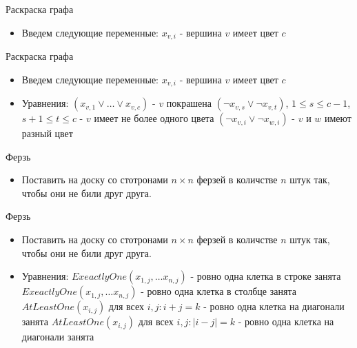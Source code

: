 \documentclass{beamer}
\begin{document}
\begin{frame}{Раскраска графа}
\begin{itemize}
\item Введем следующие переменные:\newline
$x_{v,i}$ - вершина $v$ имеет цвет $c$
\end{itemize}
\end{frame}

\begin{frame}{Раскраска графа}
\begin{itemize}
\item Введем следующие переменные:\newline
$x_{v,i}$ - вершина $v$ имеет цвет $c$
\item Уравнения:\newline
$(x_{v,1} \vee \dots \vee x_{v,c})$ - $v$ покрашена\newline
$(\lnot x_{v,s} \vee \lnot x_{v,t})$, $1 \le s \le c - 1$, $s + 1 \le t \le c$ - $v$ имеет не более одного цвета\newline
$(\lnot x_{v,i} \vee \lnot x_{w,i})$ - $v$ и $w$ имеют разный цвет
\end{itemize}
\end{frame}

\begin{frame}{Ферзь}
\begin{itemize}
\item Поставить на доску со стотронами $n\times n$ ферзей в количстве $n$ штук так, чтобы они не били друг друга.
\end{itemize}
\end{frame}

\begin{frame}{Ферзь}
\begin{itemize}
\item Поставить на доску со стотронами $n\times n$ ферзей в количстве $n$ штук так, чтобы они не били друг друга.
\item Уравнения:\newline
$ExeactlyOne(x_{1,j}, \dots x_{n, j})$ - ровно одна клетка в строке занята\newline
$ExeactlyOne(x_{1,j}, \dots x_{n, j})$ - ровно одна клетка в столбце занята\newline
$AtLeastOne(x_{i, j})$ для всех $i,j: i + j = k$ - ровно одна клетка на диагонали занята\newline
$AtLeastOne(x_{i, j})$ для всех $i,j: |i - j| = k$ - ровно одна клетка на диагонали занята\newline
\end{itemize}
\end{frame}
\end{document}

